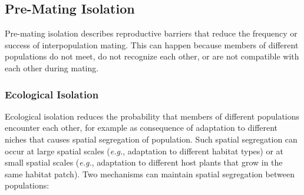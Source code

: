 \documentclass[
]{book}
\begin{document}
\hypertarget{pre-mating-isolation}{%
\subsection{Pre-Mating Isolation}\label{pre-mating-isolation}}

Pre-mating isolation describes reproductive barriers that reduce the frequency or success of interpopulation mating. This can happen because members of different populations do not meet, do not recognize each other, or are not compatible with each other during mating.

\hypertarget{ecological-isolation}{%
\subsubsection*{Ecological Isolation}\label{ecological-isolation}}

Ecological isolation reduces the probability that members of different populations encounter each other, for example as consequence of adaptation to different niches that causes spatial segregation of population. Such spatial segregation can occur at large spatial scales (\emph{e.g.}, adaptation to different habitat types) or at small spatial scales (\emph{e.g.}, adaptation to different host plants that grow in the same habitat patch). Two mechanisms can maintain spatial segregation between populations:
\end{document}
